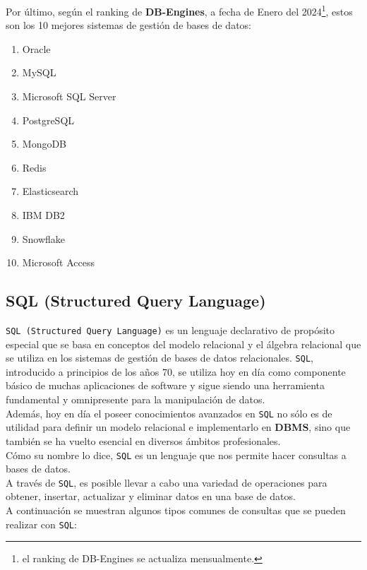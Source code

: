 Por último, según el ranking de \textbf{DB-Engines}, a fecha de Enero del 2024\footnote{el ranking de DB-Engines se actualiza mensualmente.}, estos son los 10 mejores sistemas de gestión de bases de datos:

\begin{enumerate}
    \item Oracle
    \item MySQL
    \item Microsoft SQL Server
    \item PostgreSQL
    \item MongoDB
    \item Redis
    \item Elasticsearch
    \item IBM DB2
    \item Snowflake
    \item Microsoft Access
\end{enumerate}

\subsection{SQL (Structured Query Language)}

\texttt{SQL (Structured Query Language)} es un lenguaje declarativo de propósito especial
que se basa en conceptos del modelo relacional y el álgebra relacional que se utiliza en los sistemas de gestión de bases de datos relacionales. \texttt{SQL}, introducido a principios de los años 70, se utiliza hoy en día como componente básico de muchas aplicaciones de software y sigue siendo una herramienta fundamental y omnipresente para la manipulación de datos.\\

Además, hoy en día el poseer conocimientos avanzados en \texttt{SQL} no sólo es de utilidad para definir un modelo relacional e implementarlo en \textbf{DBMS}, sino que también se ha vuelto esencial en diversos ámbitos profesionales. \\
Cómo su nombre lo dice, \texttt{SQL} es un lenguaje que nos permite hacer consultas a bases de datos.\\
A través de \texttt{SQL}, es posible llevar a cabo una variedad de operaciones para obtener, insertar, actualizar y eliminar datos en una base de datos. \\
A continuación se muestran algunos tipos comunes de consultas que se pueden realizar con \texttt{SQL}:

